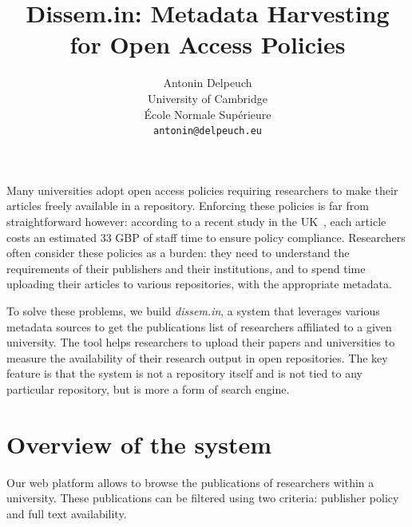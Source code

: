 \documentclass[a4paper]{article}
\begin{document}
\title{Dissem.in: Metadata Harvesting for Open Access Policies}
\author{Antonin Delpeuch \\
University of Cambridge \\
École Normale Supérieure \\
\texttt{antonin@delpeuch.eu}}

\maketitle

Many universities adopt open access policies requiring researchers to make their articles freely
available in a repository. Enforcing these policies is far from straightforward however: according to
a recent study in the UK~\cite{research2014counting},
each article costs an estimated 33 GBP of staff time to ensure policy
compliance.
Researchers often consider these policies as a burden: they need to
understand the requirements of their publishers and their institutions,
and to spend time uploading their articles to various repositories, with
the appropriate metadata.

To solve these problems, we build \emph{dissem.in}, a
system that leverages various metadata sources to get the publications
list of researchers affiliated to a given university. The tool helps
researchers to upload their papers and universities to measure the
availability of their research output in open repositories. The key
feature is that the system is not a repository itself and is not tied to
any particular repository, but is more a form of search engine.

\section{Overview of the system}

Our web platform allows to browse the publications of researchers within
a university. These publications can be filtered using two criteria:
publisher policy and full text availability.
\end{document}
